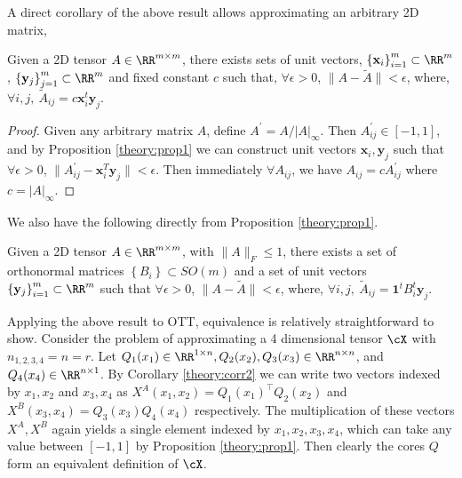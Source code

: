A direct corollary of the above result allows approximating an arbitrary 2D matrix,
\begin{corollary}\label{theory:corr1}
Given a 2D tensor $A \in \RR^{m \times m}$, there exists sets of unit vectors, $\left\{\mathbf{x}_i\right\}_{i=1}^m\subset \RR^m$, $\left\{\mathbf{y}_j\right\}_{j=1}^m\subset \RR^m$ and fixed constant $c$ such that, $\forall \epsilon > 0$, $\|A-\widetilde{A}\|< \epsilon$, where, $\forall i,j,\: \widetilde{A}_{ij}=c\mathbf{x}_i^t\mathbf{y}_j$.
\end{corollary}
\begin{proof}
Given any arbitrary matrix $A$, define $A^\prime = A/|A|_{\infty}$. Then $A^\prime_{ij} \in [-1,1]$, and by Proposition \ref{theory:prop1} we can construct unit vectors $\textbf{x}_i,\textbf{y}_j$ such that $\forall \epsilon > 0$, $\|A^\prime_{ij} - \textbf{x}_i^T\textbf{y}_j\|< \epsilon$. Then immediately $\forall A_{ij}$, we have $A_{ij} = cA^\prime_{ij}$ where $c = |A|_\infty$.
\end{proof}

We also have the following directly from Proposition \ref{theory:prop1}.
\begin{corollary}\label{theory:corr2}
Given a 2D tensor $A\in \RR^{m\times m}$, with $\|A\|_F\leq 1$, there exists a set of orthonormal matrices $\left\{B_i\right\} \subset SO(m)$ and a set of unit vectors $\left\{\mathbf{y}_j\right\}_{i=1}^m\subset \RR^m$ such that $\forall \epsilon > 0$, $\|A - \widetilde{A}\|< \epsilon$, where, $\forall i,j,\: \widetilde{A}_{ij}= \mathbf{1}^t B_i^t\mathbf{y}_j$.
\end{corollary}

\begin{example}Applying the above result to OTT, equivalence is relatively straightforward to show. 
Consider the problem of approximating a 4 dimensional tensor $\cX$ with $n_{1,2,3,4}=n=r$. Let $Q_1(x_1) \in \RR^{1\times n}, Q_2(x_2), Q_3(x_3) \in \RR^{n \times n}$, and $Q_4(x_4) \in \RR^{n \times 1}$. By Corollary \ref{theory:corr2} we can write two vectors indexed by $x_1,x_2$ and $x_3,x_4$ as $X^A (x_1,x_2) = Q_1(x_1)^\top Q_2(x_2)$ and  $X^B(x_3,x_4) = Q_3(x_3)Q_4(x_4)$ respectively. The multiplication of these vectors $X^A,X^B$ again yields a single element indexed by $x_1,x_2,x_3,x_4$, which can take any value between $[-1,1]$ by Proposition \ref{theory:prop1}. Then clearly the cores $Q$ form an equivalent definition of $\cX$.
\end{example}

